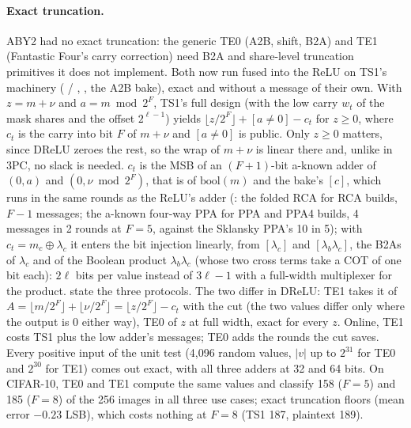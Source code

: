 \paragraph{Exact truncation.}\label{sec:triadte} ABY2 had no exact truncation: the generic TE0 (A2B, shift, B2A) and
TE1 (Fantastic Four's carry correction) need B2A and share-level truncation primitives it does not implement. Both now run
fused into the ReLU on TS1's machinery ( / , , the A2B bake), exact
and without a message of their own. With $z = m + \nu$ and $a = m \bmod 2^F$, TS1's full design (with the low carry
$w_t$ of the mask shares and the offset $2^{\ell-1}$) yields $\lfloor z / 2^F \rfloor + [a \neq 0] - c_t$ for $z \geq 0$,
where $c_t$ is the carry into bit $F$ of $m + \nu$ and $[a \neq 0]$ is public. Only $z \geq 0$ matters, since DReLU
zeroes the rest, so the wrap of $m + \nu$ is linear there and, unlike in 3PC, no slack is needed. $c_t$ is the MSB of an
$(F + 1)$-bit a-known adder of $(0, a)$ and $(0, \nu \bmod 2^F)$, that is of $\mathrm{bool}(m)$ and the bake's $[c]$,
which runs in the same rounds as the ReLU's adder (: the folded RCA for RCA builds, $F - 1$ messages;
the a-known four-way PPA for PPA and PPA4 builds, 4 messages in 2 rounds at $F = 5$, against the Sklansky PPA's 10 in
5); with $c_t = m_c \oplus \lambda_c$ it enters the bit injection linearly, from $[\lambda_c]$ and
$[\lambda_b \lambda_c]$, the B2As of $\lambda_c$ and of the Boolean product $\lambda_b \lambda_c$ (whose two cross terms
take a COT of one bit each): $2\ell$ bits per value instead of $3\ell - 1$ with a full-width multiplexer for the
product.  state the three protocols. The two differ in
DReLU: TE1 takes it of $A = \lfloor m/2^F \rfloor + \lfloor \nu/2^F \rfloor = \lfloor z/2^F \rfloor - c_t$ with the
cut (the two values differ only where the output is 0 either way), TE0 of $z$ at full width, exact for every $z$. Online,
TE1 costs TS1 plus the low adder's messages; TE0 adds the rounds the cut saves. Every positive input of
the unit test (4,096 random values, $|v|$ up to $2^{31}$ for TE0 and $2^{30}$ for TE1) comes out exact, with all three
adders at 32 and 64 bits. On CIFAR-10, TE0 and TE1 compute the same values and classify 158 ($F = 5$) and 185 ($F = 8$)
of the 256 images in all three use cases; exact truncation floors (mean error $-0.23$ LSB), which costs nothing at
$F = 8$ (TS1 187, plaintext 189).

